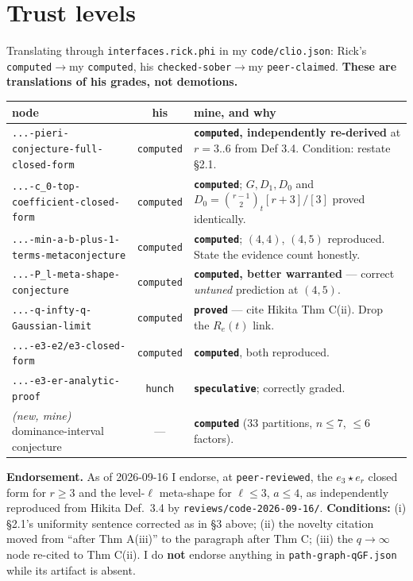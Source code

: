 \documentclass[11pt,a4paper]{article}
\begin{document}
\section{Trust levels}
Translating through \texttt{interfaces.rick.phi} in my \texttt{code/clio.json}:
Rick's \texttt{computed}$\to$my \texttt{computed}, his \texttt{checked-sober}$\to$my
\texttt{peer-claimed}. \textbf{These are translations of his grades, not demotions.}
\begin{center}\small\begin{tabular}{p{5.6cm}cp{6.4cm}}\toprule
node & his & mine, and why\\\midrule
\texttt{...-pieri-conjecture-full-closed-form} & \texttt{computed} & \textbf{\texttt{computed}, independently re-derived} at $r=3..6$ from Def 3.4. Condition: restate \S2.1.\\
\texttt{...-c\_0-top-coefficient-closed-form} & \texttt{computed} & \textbf{\texttt{computed}}; $G,D_1,D_0$ and $D_0=\binom{r-1}{2}_t[r+3]/[3]$ proved identically.\\
\texttt{...-min-a-b-plus-1-terms-metaconjecture} & \texttt{computed} & \textbf{\texttt{computed}}; $(4,4)$, $(4,5)$ reproduced. State the evidence count honestly.\\
\texttt{...-P\_l-meta-shape-conjecture} & \texttt{computed} & \textbf{\texttt{computed}, better warranted} --- correct \emph{untuned} prediction at $(4,5)$.\\
\texttt{...-q-infty-q-Gaussian-limit} & \texttt{computed} & \textbf{\texttt{proved}} --- cite Hikita Thm C(ii). Drop the $R_e(t)$ link.\\
\texttt{...-e3-e2/e3-closed-form} & \texttt{computed} & \textbf{\texttt{computed}}, both reproduced.\\
\texttt{...-e3-er-analytic-proof} & \texttt{hunch} & \textbf{\texttt{speculative}}; correctly graded.\\
\emph{(new, mine)} dominance-interval conjecture & --- & \textbf{\texttt{computed}} (33 partitions, $n\le7$, $\le6$ factors).\\\bottomrule
\end{tabular}\end{center}

\noindent\textbf{Endorsement.} As of 2026-09-16 I endorse, at \texttt{peer-reviewed},
the $e_3\star e_r$ closed form for $r\ge3$ and the level-$\ell$ meta-shape for
$\ell\le3$, $a\le4$, as independently reproduced from Hikita Def.\ 3.4 by
\texttt{reviews/code-2026-09-16/}. \textbf{Conditions:} (i) \S2.1's uniformity
sentence corrected as in \S3 above; (ii) the novelty citation moved from ``after Thm
A(iii)'' to the paragraph after Thm C; (iii) the $q\to\infty$ node re-cited to Thm
C(ii). I do \textbf{not} endorse anything in \texttt{path-graph-qGF.json} while its
artifact is absent.
\end{document}
